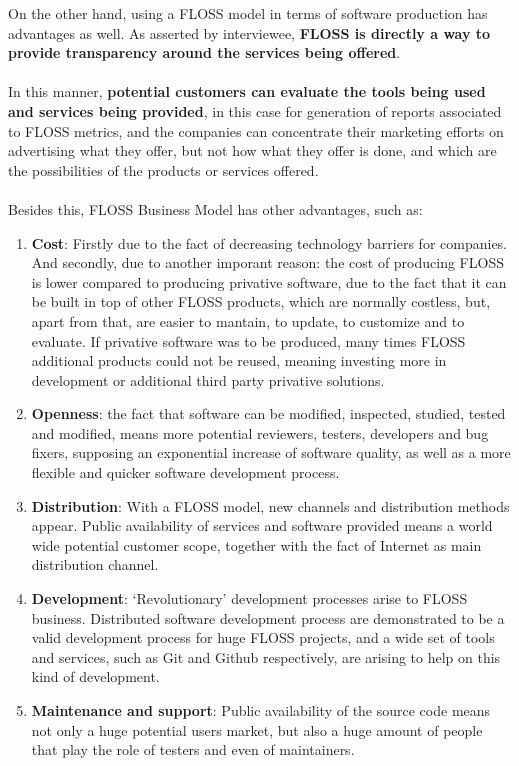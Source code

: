 \documentclass[11pt]{article}
\begin{document}
On the other hand, using a FLOSS model in terms of software production has advantages as well. As asserted by interviewee, \textbf{FLOSS is directly a way to provide transparency around the services being offered}.\\
\\
In this manner, \textbf{potential customers can evaluate the tools being used and services being provided}, in this case for generation of reports associated to FLOSS metrics, and the companies can concentrate their marketing efforts on advertising what they offer, but not how what they offer is done, and which are the possibilities of the products or services offered.\\
\\
Besides this, FLOSS Business Model has other advantages, such as:
\begin{enumerate}
\item{\textbf{Cost}}: Firstly due to the fact of decreasing technology barriers for companies. And secondly, due to another imporant reason: the cost of producing FLOSS is lower compared to producing privative software, due to the fact that it can be built in top of other FLOSS products, which are normally costless, but, apart from that, are easier to mantain, to update, to customize and to evaluate. If privative software was to be produced, many times FLOSS additional products could not be reused, meaning investing more in development or additional third party privative solutions.
\item{\textbf{Openness}}: the fact that software can be modified, inspected, studied, tested and modified, means more potential reviewers, testers, developers and bug fixers, supposing an exponential increase of software quality, as well as a more flexible and quicker software development process.
\item{\textbf{Distribution}}: With a FLOSS model, new channels and distribution methods appear. Public availability of services and software provided means a world wide potential customer scope, together with the fact of Internet as main distribution channel.
\item{\textbf{Development}}: ‘Revolutionary’ development processes arise to FLOSS business. Distributed software development process are demonstrated to be a valid development process for huge FLOSS projects, and a wide set of tools and services, such as Git and Github respectively, are arising to help on this kind of development.
\item{\textbf{Maintenance and support}}: Public availability of the source code means not only a huge potential users market, but also a huge amount of people that play the role of testers and even of maintainers.
\end{enumerate}
\end{document}
